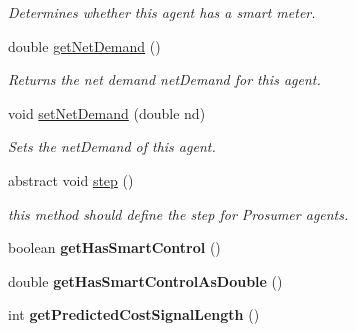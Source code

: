 \begin{DoxyCompactItemize}
\begin{DoxyCompactList}\small\item\em Determines whether this agent has a smart meter. \end{DoxyCompactList}\item 
double \hyperlink{classuk_1_1ac_1_1dmu_1_1iesd_1_1cascade_1_1agents_1_1prosumers_1_1_prosumer_agent_a0e29a0e3c42a22d4928fc3d4355839da}{get\-Net\-Demand} ()
\begin{DoxyCompactList}\small\item\em Returns the net demand {\ttfamily net\-Demand} for this agent. \end{DoxyCompactList}\item 
void \hyperlink{classuk_1_1ac_1_1dmu_1_1iesd_1_1cascade_1_1agents_1_1prosumers_1_1_prosumer_agent_af2175ee49726bb96de3807cd2bf8fb71}{set\-Net\-Demand} (double nd)
\begin{DoxyCompactList}\small\item\em Sets the {\ttfamily net\-Demand} of this agent. \end{DoxyCompactList}\item 
abstract void \hyperlink{classuk_1_1ac_1_1dmu_1_1iesd_1_1cascade_1_1agents_1_1prosumers_1_1_prosumer_agent_a04cfe275806d2341eaa16350027f8947}{step} ()
\begin{DoxyCompactList}\small\item\em this method should define the step for Prosumer agents. \end{DoxyCompactList}\item 
\hypertarget{classuk_1_1ac_1_1dmu_1_1iesd_1_1cascade_1_1agents_1_1prosumers_1_1_prosumer_agent_a87779946140d133c61752cdab13d259a}{boolean {\bfseries get\-Has\-Smart\-Control} ()}\label{classuk_1_1ac_1_1dmu_1_1iesd_1_1cascade_1_1agents_1_1prosumers_1_1_prosumer_agent_a87779946140d133c61752cdab13d259a}

\item 
\hypertarget{classuk_1_1ac_1_1dmu_1_1iesd_1_1cascade_1_1agents_1_1prosumers_1_1_prosumer_agent_a7281da7641d84f6e9964ea8ef9347a15}{double {\bfseries get\-Has\-Smart\-Control\-As\-Double} ()}\label{classuk_1_1ac_1_1dmu_1_1iesd_1_1cascade_1_1agents_1_1prosumers_1_1_prosumer_agent_a7281da7641d84f6e9964ea8ef9347a15}

\item 
\hypertarget{classuk_1_1ac_1_1dmu_1_1iesd_1_1cascade_1_1agents_1_1prosumers_1_1_prosumer_agent_ac67ddeb0bf184fe38131f0af4cf796a4}{int {\bfseries get\-Predicted\-Cost\-Signal\-Length} ()}\label{classuk_1_1ac_1_1dmu_1_1iesd_1_1cascade_1_1agents_1_1prosumers_1_1_prosumer_agent_ac67ddeb0bf184fe38131f0af4cf796a4}


\end{DoxyCompactItemize}
